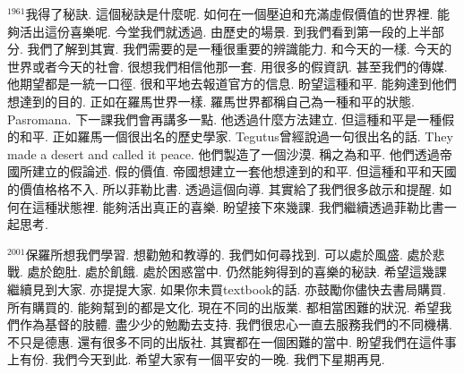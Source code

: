 \documentclass{book}
\begin{document}
$^{1961}$我得了秘訣.
這個秘訣是什麼呢.
如何在一個壓迫和充滿虛假價值的世界裡.
能夠活出這份喜樂呢.
今堂我們就透過.
由歷史的場景.
到我們看到第一段的上半部分.
我們了解到其實.
我們需要的是一種很重要的辨識能力.
和今天的一樣.
今天的世界或者今天的社會.
很想我們相信他那一套.
用很多的假資訊.
甚至我們的傳媒.
他期望都是一統一口徑.
很和平地去報道官方的信息.
盼望這種和平.
能夠達到他們想達到的目的.
正如在羅馬世界一樣.
羅馬世界都稱自己為一種和平的狀態.
Pasromana.
下一課我們會再講多一點.
他透過什麼方法建立.
但這種和平是一種假的和平.
正如羅馬一個很出名的歷史學家.
Tegutus曾經說過一句很出名的話.
They made a desert and called it peace.
他們製造了一個沙漠.
稱之為和平.
他們透過帝國所建立的假論述.
假的價值.
帝國想建立一套他想達到的和平.
但這種和平和天國的價值格格不入.
所以菲勒比書.
透過這個向導.
其實給了我們很多啟示和提醒.
如何在這種狀態裡.
能夠活出真正的喜樂.
盼望接下來幾課.
我們繼續透過菲勒比書一起思考.

$^{2001}$保羅所想我們學習.
想勸勉和教導的.
我們如何尋找到.
可以處於風盛.
處於悲戰.
處於飽肚.
處於飢餓.
處於困惑當中.
仍然能夠得到的喜樂的秘訣.
希望這幾課繼續見到大家.
亦提提大家.
如果你未買textbook的話.
亦鼓勵你儘快去書局購買.
所有購買的.
能夠幫到的都是文化.
現在不同的出版業.
都相當困難的狀況.
希望我們作為基督的肢體.
盡少少的勉勵去支持.
我們很忠心一直去服務我們的不同機構.
不只是德惠.
還有很多不同的出版社.
其實都在一個困難的當中.
盼望我們在這件事上有份.
我們今天到此.
希望大家有一個平安的一晚.
我們下星期再見.
\newpage
\end{document}

